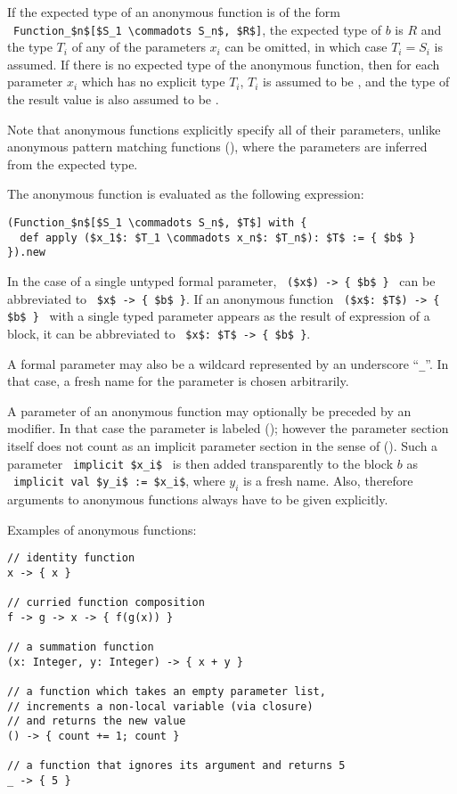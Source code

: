 If the expected type of an anonymous function is of the form ~\lstinline!Function_$n$[$S_1 \commadots S_n$, $R$]!, the expected type of $b$ is $R$ and the type $T_i$ of any of the parameters $x_i$ can be omitted, in which case $T_i = S_i$ is assumed. If there is no expected type of the anonymous function, then for each parameter $x_i$ which has no explicit type $T_i$, $T_i$ is assumed to be , and the type of the result value is also assumed to be . 

Note that anonymous functions explicitly specify all of their parameters, unlike anonymous pattern matching functions (), where the parameters are inferred from the expected type. 

The anonymous function is evaluated as the following expression:
\begin{lstlisting}
(Function_$n$[$S_1 \commadots S_n$, $T$] with {
  def apply ($x_1$: $T_1 \commadots x_n$: $T_n$): $T$ := { $b$ }
}).new
\end{lstlisting}

In the case of a single untyped formal parameter, ~\lstinline!($x$) -> { $b$ }!~ can be abbreviated to ~\lstinline!$x$ -> { $b$ }!. If an anonymous function ~\lstinline!($x$: $T$) -> { $b$ }!~ with a single typed parameter appears as the result of expression of a block, it can be abbreviated to ~\lstinline!$x$: $T$ -> { $b$ }!.

A formal parameter may also be a wildcard represented by an underscore ``\lstinline!_!''. In that case, a fresh name for the parameter is chosen arbitrarily. 

A parameter of an anonymous function may optionally be preceded by an  modifier. In that case the parameter is labeled  (); however the parameter section itself does not count as an implicit parameter section in the sense of (). Such a parameter ~\lstinline!implicit $x_i$!~ is then added transparently to the block $b$ as ~\lstinline!implicit val $y_i$ := $x_i$!, where $y_i$ is a fresh name. Also, therefore arguments to anonymous functions always have to be given explicitly. 

\example Examples of anonymous functions:
\begin{lstlisting}
// identity function
x -> { x }

// curried function composition
f -> g -> x -> { f(g(x)) }

// a summation function
(x: Integer, y: Integer) -> { x + y }

// a function which takes an empty parameter list,
// increments a non-local variable (via closure)
// and returns the new value
() -> { count += 1; count }

// a function that ignores its argument and returns 5
_ -> { 5 }
\end{lstlisting}







